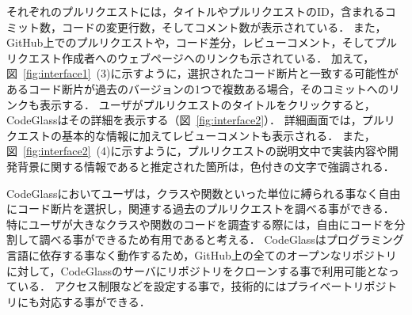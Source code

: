 それぞれのプルリクエストには，タイトルやプルリクエストのID，含まれるコミット数，コードの変更行数，そしてコメント数が表示されている．
また，GitHub上でのプルリクエストや，コード差分，レビューコメント，そしてプルリクエスト作成者へのウェブページへのリンクも示されている．
加えて，図~\ref{fig:interface1}~(3)に示すように，選択されたコード断片と一致する可能性があるコード断片が過去のバージョンの1つで複数ある場合，そのコミットへのリンクも表示する．
ユーザがプルリクエストのタイトルをクリックすると，CodeGlassはその詳細を表示する（図~\ref{fig:interface2}）．
詳細画面では，プルリクエストの基本的な情報に加えてレビューコメントも表示される．
また，図~\ref{fig:interface2}~(4)に示すように，プルリクエストの説明文中で実装内容や開発背景に関する情報であると推定された箇所は，色付きの文字で強調される．


CodeGlassにおいてユーザは，クラスや関数といった単位に縛られる事なく自由にコード断片を選択し，関連する過去のプルリクエストを調べる事ができる．
特にユーザが大きなクラスや関数のコードを調査する際には，自由にコードを分割して調べる事ができるため有用であると考える．
CodeGlassはプログラミング言語に依存する事なく動作するため，GitHub上の全てのオープンなリポジトリに対して，CodeGlassのサーバにリポジトリをクローンする事で利用可能となっている．
アクセス制限などを設定する事で，技術的にはプライベートリポジトリにも対応する事ができる．


